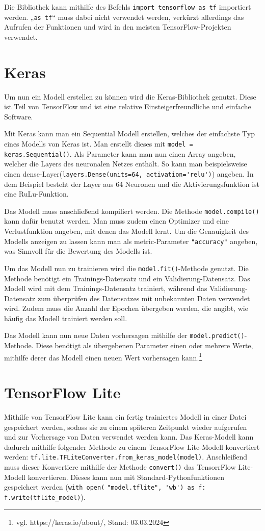 \documentclass[11pt,oneside]{report}
\begin{document}
Die Bibliothek kann mithilfe des Befehls \verb+import tensorflow as tf+ importiert werden. „\verb+as tf+“ muss dabei nicht verwendet werden, verkürzt allerdings das Aufrufen der Funktionen und wird in den meisten TensorFlow-Projekten verwendet.

\section{Keras}
Um nun ein Modell erstellen zu können wird die Keras-Bibliothek genutzt. Diese ist Teil von TensorFlow und ist eine relative Einsteigerfreundliche und einfache Software.

Mit Keras kann man ein Sequential Modell erstellen, welches der einfachste Typ eines Modells von Keras ist. Man erstellt dieses mit \verb+model = keras.Sequential()+. Als Parameter kann man nun einen Array angeben, welcher die Layers des neuronalen Netzes enthält. So kann man beispielsweise einen dense-Layer(\verb+layers.Dense(units=64, activation='relu')+) angeben. In dem Beispiel besteht der Layer aus 64 Neuronen und die Aktivierungsfunktion ist eine RuLu-Funktion.

Das Modell muss anschließend kompiliert werden. Die Methode \verb+model.compile()+ kann dafür benutzt werden. Man muss zudem einen Optimizer und eine Verlustfunktion angeben, mit denen das Modell lernt. Um die Genauigkeit des Modells anzeigen zu lassen kann man als metric-Parameter \verb+"accuracy"+ angeben, was Sinnvoll für die Bewertung des Modells ist.

Um das Modell nun zu trainieren wird die \verb+model.fit()+-Methode genutzt. Die Methode benötigt ein Trainings-Datensatz und ein Validierung-Datensatz. Das Modell wird mit dem Trainings-Datensatz trainiert, während das Validierung-Datensatz zum überprüfen des Datensatzes mit unbekannten Daten verwendet wird. Zudem muss die Anzahl der Epochen übergeben werden, die angibt, wie häufig das Modell trainiert werden soll.

Das Modell kann nun neue Daten vorhersagen mithilfe der \verb+model.predict()+-Methode. Diese benötigt als übergebenen Parameter einen oder mehrere Werte, mithilfe derer das Modell einen neuen Wert vorhersagen kann.\footnote{vgl. https://keras.io/about/, Stand: 03.03.2024}

\section{TensorFlow Lite}
Mithilfe von TensorFlow Lite kann ein fertig trainiertes Modell in einer Datei gespeichert werden, sodass sie zu einem späteren Zeitpunkt wieder aufgerufen und zur Vorhersage von Daten verwendet werden kann. Das Keras-Modell kann dadurch mithilfe folgender Methode zu einem TensorFlow Lite-Modell konvertiert werden: \verb+tf.lite.TFLiteConverter.from_keras_model(model)+. Anschleißend muss dieser Konvertiere mithilfe der Methode \verb+convert()+ das TensorrFlow Lite-Modell konvertieren. Dieses kann nun mit Standard-Pythonfunktionen gespeichert werden (\verb+with open(+ \verb+"model.tflite", 'wb') as f: f.write(tflite_model)+).
\end{document}
